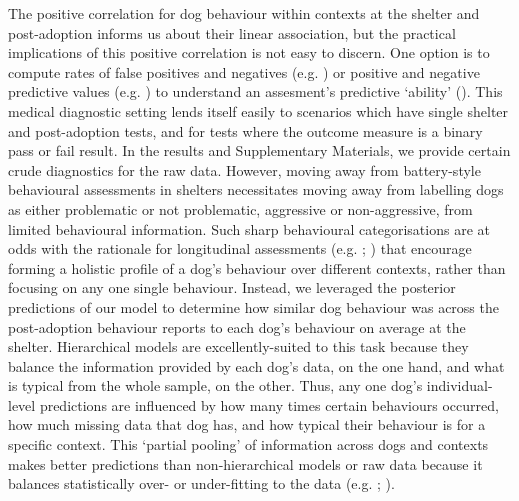 \documentclass[12pt]{article}
\begin{document}
The positive correlation for dog behaviour within contexts at the shelter and post-adoption informs us about their linear association, but the practical implications of this positive correlation is not easy to discern. One option is to compute rates of false positives and negatives (e.g. \cite{marder2013}) or positive and negative predictive values (e.g. \cite{patbrad2016}) to understand an assesment's predictive `ability' (\cite{patronek2019}). This medical diagnostic setting lends itself easily to scenarios which have single shelter and post-adoption tests, and for tests where the outcome measure is a binary pass or fail result. In the results and Supplementary Materials, we provide certain crude diagnostics for the raw data. However, moving away from battery-style behavioural assessments in shelters necessitates moving away from labelling dogs as either problematic or not problematic, aggressive or non-aggressive, from limited behavioural information. Such sharp behavioural categorisations are at odds with the rationale for longitudinal assessments (e.g. \cite{ASPCA2018}; \cite{rayment2015}) that encourage forming a holistic profile of a dog's behaviour over different contexts, rather than focusing on any one single behaviour. Instead, we leveraged the posterior predictions of our model to determine how similar dog behaviour was across the post-adoption behaviour reports to each dog's behaviour on average at the shelter. Hierarchical models are excellently-suited to this task because they balance the information provided by each dog's data, on the one hand, and what is typical from the whole sample, on the other. Thus, any one dog's individual-level predictions are influenced by how many times certain behaviours occurred, how much missing data that dog has, and how typical their behaviour is for a specific context. This `partial pooling' of information across dogs and contexts makes better predictions than non-hierarchical models or raw data because it balances statistically over- or under-fitting to the data (e.g. \cite{gelman2007}; \cite{mcelreath2014}).
\end{document}
